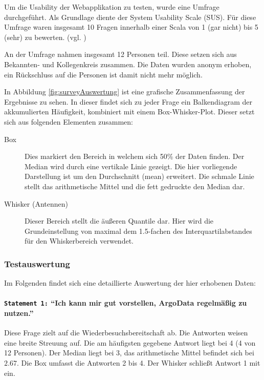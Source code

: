 Um die Usability der Webapplikation zu testen, wurde eine Umfrage durchgeführt. Als Grundlage diente der System Usability Scale (SUS).
Für diese Umfrage waren insgesamt 10 Fragen innerhalb einer Scala von 1 (gar nicht) bis 5 (sehr)  zu bewerten. (vgl. \cite{Quantita52:online})

An der Umfrage nahmen insgesamt 12 Personen teil. Diese setzen sich aus Bekannten- und Kollegenkreis zusammen. Die Daten wurden anonym erhoben, ein Rückschluss auf die Personen ist damit nicht mehr möglich.

In Abbildung \ref{fig:surveyAuswertung}
ist eine grafische Zusammenfassung der Ergebnisse zu sehen. In dieser findet sich zu jeder Frage ein Balkendiagram der akkumulierten Häufigkeit, kombiniert mit einem Box-Whisker-Plot. Dieser setzt sich aus folgenden Elementen zusammen:

\begin{description}
 \item [Box]
    Dies markiert den Bereich in welchem sich 50\% der Daten finden. Der Median wird durch eine vertikale Linie gezeigt. Die hier vorliegende Darstellung ist um den Durchschnitt (mean) erweitert. Die schmale Linie stellt das arithmetische Mittel und die fett gedruckte den Median dar.
 \item [Whisker (Antennen)]
    Dieser Bereich stellt die äußeren Quantile dar. Hier wird die Grundeinstellung von maximal dem 1.5-fachen des Interquartilabstandes für den Whiskerbereich verwendet.
\end{description}


\subsubsection{Testauswertung}

Im Folgenden findet sich eine detaillierte Auswertung der hier erhobenen Daten:


\paragraph{\texttt{Statement 1:} "`Ich kann mir gut vorstellen, ArgoData regelmäßig zu nutzen."'}
    Diese Frage zielt auf die Wiederbesuchsbereitschaft ab. Die Antworten weisen eine breite Streuung auf. Die am häufigsten gegebene Antwort liegt bei 4 (4 von 12 Personen). Der Median liegt bei 3, das arithmetische Mittel befindet sich bei $2.67$. Die Box umfasst die Antworten 2 bis 4. Der Whisker schließt Antwort 1 mit ein.

